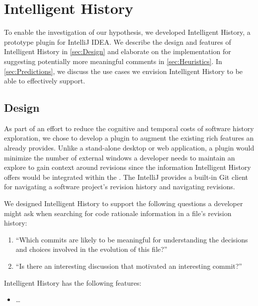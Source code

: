 \chapter{Intelligent History}
\label{ch:Intelligent-History}

To enable the investigation of our hypothesis, we developed Intelligent History, a prototype plugin for IntelliJ IDEA.
We describe the design and features of Intelligent History in \autoref{sec:Design} and elaborate on the implementation
for suggesting potentially more meaningful comments in \autoref{sec:Heuristics}.
In \autoref{sec:Predictions}, we discuss the use cases we envision Intelligent History to be able to effectively support.

\section{Design}
\label{sec:Design}

As part of an effort to reduce the cognitive and temporal costs of software history exploration, we chose to develop a plugin to augment the existing rich features an  already provides.
Unlike a stand-alone desktop or web application, a plugin would minimize the number of external windows a developer needs to maintain an explore to gain context around revisions since the information Intelligent History offers would be integrated within the .
The IntelliJ  provides a built-in Git client  for navigating a software project's revision history and navigating revisions.

We designed Intelligent History to support the following questions a developer might ask when searching for code rationale information in a file's revision history:

\begin{enumerate}
    \item ``Which commits are likely to be meaningful for understanding the decisions and choices involved in the evolution of this file?''
    \item ``Is there an interesting discussion that motivated an interesting commit?''
\end{enumerate}

Intelligent History has the following features:

\begin{itemize}
    \item \dots
\end{itemize}


